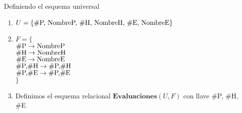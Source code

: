 \begin{frame}{Definiendo el esquema universal}


    \begin{enumerate}
        \item $U = \{ \textnormal{\#P, NombreP,  \#H, NombreH, \#E, NombreE}\}$
        \item $F = \{$ \\
        \hspace{10mm} $\textnormal{\#P} \to \textnormal{NombreP}$\\
        \hspace{10mm} $\textnormal{\#H} \to \textnormal{NombreH}$\\
        \hspace{10mm} $\textnormal{\#E} \to \textnormal{NombreE}$\\
        \hspace{10mm} $\textnormal{\#P,\#H} \to \textnormal{\#P,\#H}$\\
        \hspace{10mm} $\textnormal{\#P,\#E} \to \textnormal{\#P,\#E}$\\
        $\}$
        \item Definimos el esquema relacional $\textbf{Evaluaciones}(U,F)$ con llave \#P, \#H, \#E
    \end{enumerate}


\end{frame}

